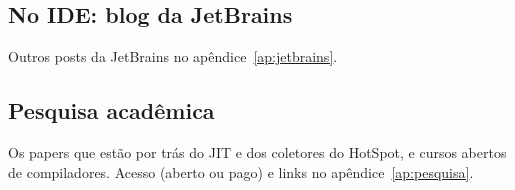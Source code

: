 \subsection*{No IDE: blog da JetBrains}
Outros posts da JetBrains no apêndice~\ref{ap:jetbrains}.
\begin{itemize}
\end{itemize}

\subsection*{Pesquisa acadêmica}
Os papers que estão por trás do JIT e dos coletores do HotSpot, e cursos
abertos de compiladores. Acesso (aberto ou pago) e links no
apêndice~\ref{ap:pesquisa}.
